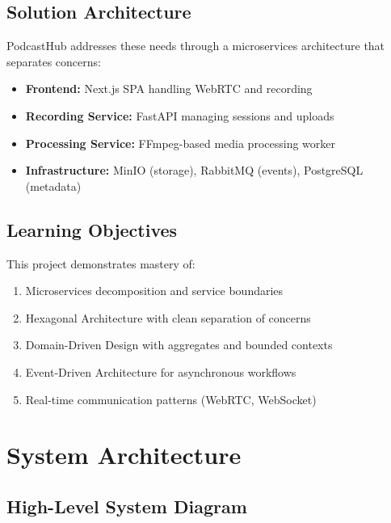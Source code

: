 \documentclass[12pt,a4paper]{article}
\begin{document}
\subsection{Solution Architecture}
PodcastHub addresses these needs through a microservices architecture that separates concerns:
\begin{itemize}[noitemsep]
    \item \textbf{Frontend:} Next.js SPA handling WebRTC and recording
    \item \textbf{Recording Service:} FastAPI managing sessions and uploads
    \item \textbf{Processing Service:} FFmpeg-based media processing worker
    \item \textbf{Infrastructure:} MinIO (storage), RabbitMQ (events), PostgreSQL (metadata)
\end{itemize}

\subsection{Learning Objectives}
This project demonstrates mastery of:
\begin{enumerate}[noitemsep]
    \item Microservices decomposition and service boundaries
    \item Hexagonal Architecture with clean separation of concerns
    \item Domain-Driven Design with aggregates and bounded contexts
    \item Event-Driven Architecture for asynchronous workflows
    \item Real-time communication patterns (WebRTC, WebSocket)
\end{enumerate}

\section{System Architecture}

\subsection{High-Level System Diagram}
\end{document}

